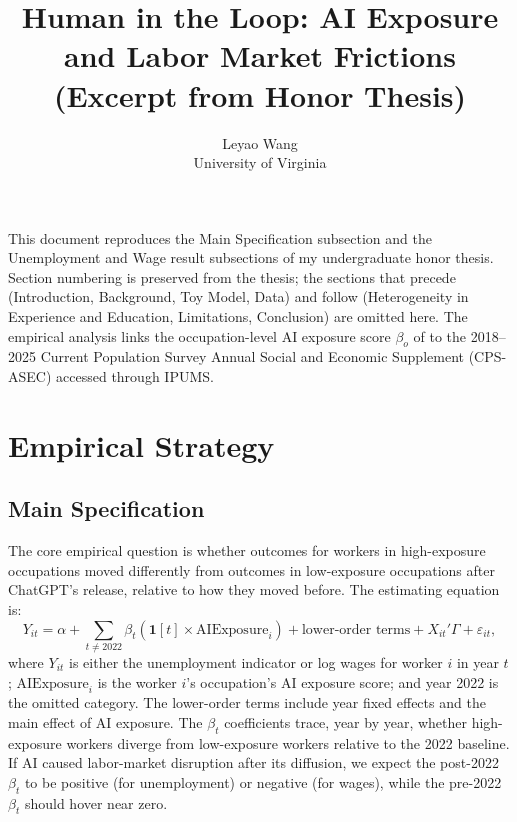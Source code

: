 \documentclass[11pt]{article}
\title{Human in the Loop: AI Exposure and Labor Market Frictions\\
       \large (Excerpt from Honor Thesis)}
\author{Leyao Wang\\ \small University of Virginia}
\date{}
\begin{document}
\maketitle
\doublespacing

\noindent This document reproduces the Main Specification subsection and the Unemployment and Wage result subsections of my undergraduate honor thesis.  Section numbering is preserved from the thesis; the sections that precede (Introduction, Background, Toy Model, Data) and follow (Heterogeneity in Experience and Education, Limitations, Conclusion) are omitted here.  The empirical analysis links the occupation-level AI exposure score $\beta_o$ of \textcite{eloundou2024gpts} to the 2018--2025 Current Population Survey Annual Social and Economic Supplement (CPS-ASEC) accessed through IPUMS.

\setcounter{section}{4}

\section{Empirical Strategy}

\subsection{Main Specification}

The core empirical question is whether outcomes for workers in high-exposure occupations moved differently from outcomes in low-exposure occupations after ChatGPT's release, relative to how they moved before. The estimating equation is:
\begin{equation}
\label{eq:main}
Y_{it} = \alpha
  + \sum_{t \neq 2022} \beta_t \left( \mathbf{1}[t] \times \text{AIExposure}_i \right)
  + \text{lower-order terms} + X_{it}'\Gamma + \varepsilon_{it},
\end{equation}
where $Y_{it}$ is either the unemployment indicator or log wages for worker $i$ in year $t$; $\text{AIExposure}_i$ is the worker $i$'s occupation's AI exposure score; and year 2022 is the omitted category.  The lower-order terms include year fixed effects and the main effect of AI exposure.  The $\beta_t$ coefficients trace, year by year, whether high-exposure workers diverge from low-exposure workers relative to the 2022 baseline.  If AI caused labor-market disruption after its diffusion, we expect the post-2022 $\beta_t$ to be positive (for unemployment) or negative (for wages), while the pre-2022 $\beta_t$ should hover near zero.
\end{document}
